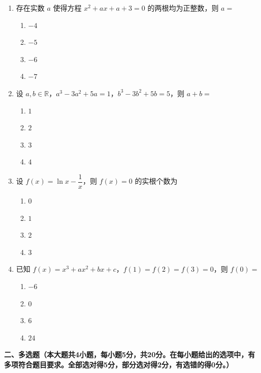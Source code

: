 \documentclass[12pt, a4paper]{ctexart}
\newcommand{\score}[1]{\hfill\makebox[2cm][l]{(#1分)}}
\begin{document}
\begin{enumerate}
\item 存在实数 $a$ 使得方程 $x^2 + ax + a + 3 = 0$ 的两根均为正整数，则 $a = $\score{5}
\begin{enumerate}[label=\Alph*.]
\item $-4$
\item $-5$
\item $-6$
\item $-7$
\end{enumerate}

\item 设 $a, b \in \mathbb{R}$，$a^3 - 3a^2 + 5a = 1$，$b^3 - 3b^2 + 5b = 5$，则 $a + b = $\score{5}
\begin{enumerate}[label=\Alph*.]
\item $1$
\item $2$
\item $3$
\item $4$
\end{enumerate}

\item 设 $f(x) = \ln x - \dfrac{1}{x}$，则 $f(x) = 0$ 的实根个数为\score{5}
\begin{enumerate}[label=\Alph*.]
\item $0$
\item $1$
\item $2$
\item $3$
\end{enumerate}

\item 已知 $f(x) = x^3 + ax^2 + bx + c$，$f(1) = f(2) = f(3) = 0$，则 $f(0) = $\score{5}
\begin{enumerate}[label=\Alph*.]
\item $-6$
\item $0$
\item $6$
\item $24$
\end{enumerate}

\end{enumerate}

\vspace{0.5cm}

\noindent\textbf{二、多选题（本大题共4小题，每小题5分，共20分。在每小题给出的选项中，有多项符合题目要求。全部选对得5分，部分选对得2分，有选错的得0分。）}

\vspace{0.3cm}
\end{document}
